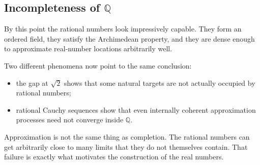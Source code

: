 
\subsection{Incompleteness of $\mathbb{Q}$}
\label{sec:incompleteness-q}

By this point the rational numbers look impressively capable. They form
an ordered field, they satisfy the Archimedean property, and they are
dense enough to approximate real-number locations arbitrarily well.

\begin{remark}
Two different phenomena now point to the same conclusion:
\begin{itemize}
  \item the gap at $\sqrt{2}$ shows that some natural targets are not
        actually occupied by rational numbers;
  \item rational Cauchy sequences show that even internally coherent
        approximation processes need not converge inside $\mathbb{Q}$.
\end{itemize}
\end{remark}

\begin{remark}
Approximation is not the same thing as completion. The rational numbers
can get arbitrarily close to many limits that they do not themselves
contain. That failure is exactly what motivates the construction of the
real numbers.
\end{remark}
